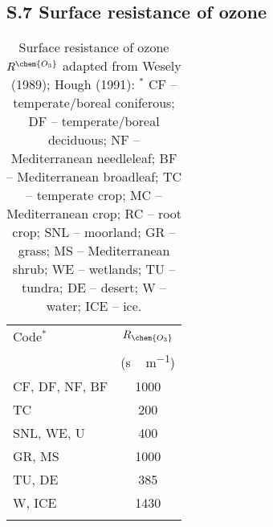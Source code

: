 \documentclass[manuscript]{copernicus}
\begin{document}
\subsection*{S.7 Surface resistance of ozone}
\begin{table*}[!htbp]
  \caption{Surface resistance of ozone $R^\chem{O_3}$ adapted from  Wesely (1989); Hough (1991): $^*$ CF -- temperate/boreal coniferous; DF -- temperate/boreal deciduous; NF -- Mediterranean needleleaf; BF -- Mediterranean broadleaf; TC -- temperate crop; MC -- Mediterranean crop; RC -- root crop; SNL -- moorland; GR -- grass; MS -- Mediterranean shrub; WE -- wetlands; TU -- tundra; DE -- desert; W -- water; ICE -- ice.}
  \begin{tabular}{lc}
    \tophline
    Code$^*$ & $R_\chem{O_3}$\\
         & (\unit{s\,m^{-1}})\\
    \middlehline
    CF, DF, NF, BF &  1000\\
    TC &  200 \\
    SNL, WE, U & 400 \\
    GR, MS  & 1000 \\
    TU, DE  & 385 \\
    W, ICE  & 1430 \\
    \bottomhline
 \end{tabular}
\end{table*}
\end{document}
